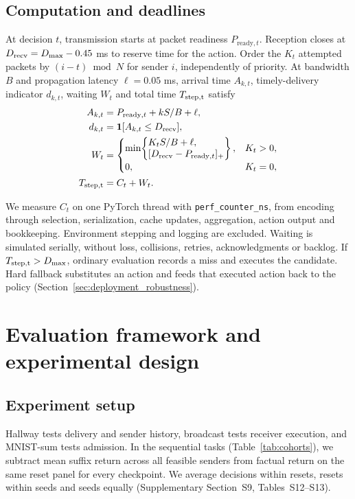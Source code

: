\documentclass[pdflatex,sn-mathphys-num]{sn-jnl}
\newcommand{\ind}{\mathbf{1}}
\begin{document}
\subsection{Computation and deadlines}
At decision $t$, transmission starts at packet readiness $P_{\mathrm{ready},t}$. Reception closes at $D_{\rm recv}=D_{\max}-0.45$ ms to reserve time for the action. Order the $K_t$ attempted packets by $(i-t)\bmod N$ for sender $i$, independently of priority. At bandwidth $B$ and propagation latency $\ell=0.05$ ms, arrival time $A_{k,t}$, timely-delivery indicator $d_{k,t}$, waiting $W_t$ and total time $T_{\rm step,t}$ satisfy
\begingroup{}
\begin{align}
 A_{k,t}&=P_{\mathrm{ready},t}+kS/B+\ell,\nonumber\\ d_{k,t}&=\ind[A_{k,t}\le D_{\rm recv}],\\
 W_t&=\begin{cases}\min\!\left\{\begin{aligned}&K_tS/B+\ell,\\&[D_{\rm recv}-P_{\mathrm{ready},t}]_+\end{aligned}\right\},&K_t>0,\\0,&K_t=0,\end{cases}\\
 T_{\rm step,t}&=C_t+W_t.\label{eq:step}
\end{align}
\endgroup

We measure $C_t$ on one PyTorch thread with \texttt{perf\_counter\_ns}, from encoding through selection, serialization, cache updates, aggregation, action output and bookkeeping. Environment stepping and logging are excluded. Waiting is simulated serially, without loss, collisions, retries, acknowledgments or backlog. If $T_{\rm step,t}>D_{\max}$, ordinary evaluation records a miss and executes the candidate. Hard fallback substitutes an action and feeds that executed action back to the policy (Section~\ref{sec:deployment_robustness}).

\section{Evaluation framework and experimental design}\label{sec:design}
\subsection{Experiment setup}
Hallway tests delivery and sender history, broadcast tests receiver execution, and MNIST-sum tests admission. In the sequential tasks (Table~\ref{tab:cohorts}), we subtract mean suffix return across all feasible senders from factual return on the same reset panel for every checkpoint. We average decisions within resets, resets within seeds and seeds equally (Supplementary Section~S9, Tables~S12--S13).
\end{document}
